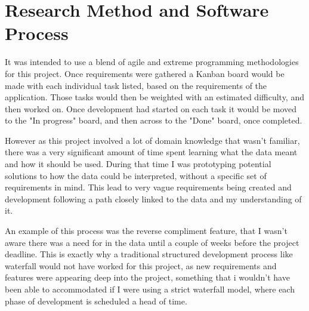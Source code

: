 \section{Research Method and Software Process}
It was intended to use a blend of agile and extreme programming methodologies for this project. Once requirements were gathered a Kanban board would be made with each individual task listed, based on the requirements of the application. Those tasks would then be weighted with an estimated difficulty, and then worked on. Once development had started on each task it would be moved to the "In progress" board, and then across to the "Done" board, once completed. 

However as this project involved a lot of domain knowledge that wasn't familiar, there was a very significant amount of time spent learning what the data meant and how it should be used. During that time I was prototyping potential solutions to how the data could be interpreted, without a specific set of requirements in mind. This lead to very vague requirements being created and development following a path closely linked to the data and my understanding of it. 

An example of this process was the reverse compliment feature, that I wasn't aware there was a need for in the data until a couple of weeks before the project deadline. This is exactly why a traditional structured development process like waterfall would not have worked for this project, as new requirements and features were appearing deep into the project, something that i wouldn't have been able to accommodated if I were using a strict waterfall model, where each phase of development is scheduled a head of time.


